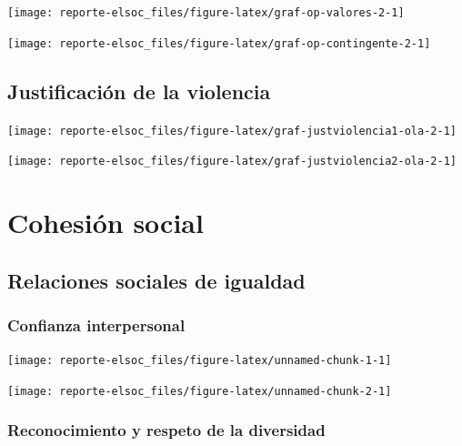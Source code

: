 \documentclass[
  12pt,
]{book}
\begin{document}
\begin{center}\texttt{[image: reporte-elsoc\_files/figure-latex/graf-op-valores-2-1]} \end{center}

\begin{center}\texttt{[image: reporte-elsoc\_files/figure-latex/graf-op-contingente-2-1]} \end{center}

\hypertarget{justificaciuxf3n-de-la-violencia}{%
\section{Justificación de la violencia}\label{justificaciuxf3n-de-la-violencia}}

\begin{center}\texttt{[image: reporte-elsoc\_files/figure-latex/graf-justviolencia1-ola-2-1]} \end{center}

\begin{center}\texttt{[image: reporte-elsoc\_files/figure-latex/graf-justviolencia2-ola-2-1]} \end{center}

\hypertarget{cohesiuxf3n-social}{%
\chapter{Cohesión social}\label{cohesiuxf3n-social}}

\hypertarget{relaciones-sociales-de-igualdad}{%
\section{Relaciones sociales de igualdad}\label{relaciones-sociales-de-igualdad}}

\hypertarget{confianza-interpersonal}{%
\subsection{Confianza interpersonal}\label{confianza-interpersonal}}

\begin{center}\texttt{[image: reporte-elsoc\_files/figure-latex/unnamed-chunk-1-1]} \end{center}

\begin{center}\texttt{[image: reporte-elsoc\_files/figure-latex/unnamed-chunk-2-1]} \end{center}

\hypertarget{reconocimiento-y-respeto-de-la-diversidad}{%
\subsection{Reconocimiento y respeto de la diversidad}\label{reconocimiento-y-respeto-de-la-diversidad}}
\end{document}
